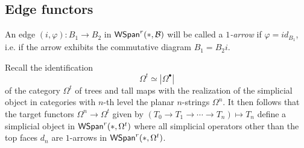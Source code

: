 \documentclass[a4paper,10pt
,draft
]{article}%
\renewcommand{\1}{\ensuremath{\mathbb{id}}}
\begin{document}
\subsection{Edge functors}

\begin{notation}
An edge $(i,\varphi)\colon B_1 \to B_2$ in $\mathsf{WSpan}^r(\**,\mathcal{B})$
will be called a 
\textit{$1$-arrow}
if $\varphi = id_{B_1}$,
i.e. if the arrow exhibits the commutative diagram
$B_1 = B_2 i$.
\end{notation}


Recall the identification
\[
\Omega^t \simeq |\Omega^{\bullet}|
\]
of the category $\Omega^t$ of trees and tall maps with the realization of the simplicial object in categories with $n$-th level the planar $n$-strings $\Omega^{n}$.
It then follows that the target functors
$\Omega^n \to \Omega^t$
given by 
$(T_0 \to T_1 \to \cdots \to T_n)
\mapsto T_n$
define a simplicial object in 
$\mathsf{WSpan}^r(\**,\Omega^t)$
where all simplicial operators other than the top faces $d_n$ are $1$-arrows in
$\mathsf{WSpan}^r(\**,\Omega^t)$.
\end{document}
